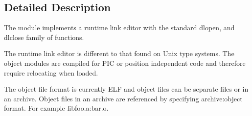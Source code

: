 \subsection{Detailed Description}
The module implements a runtime link editor with the standard dlopen, and dlclose family of functions.

The runtime link editor is different to that found on Unix type systems. The object modules are compiled for P\+IC or position independent code and therefore require relocating when loaded.

The object file format is currently E\+LF and object files can be separate files or in an archive. Object files in an archive are referenced by specifying \textquotesingle{}archive\+:object\textquotesingle{} format. For example \textquotesingle{}libfoo.\+a\+:bar.\+o\textquotesingle{}. 